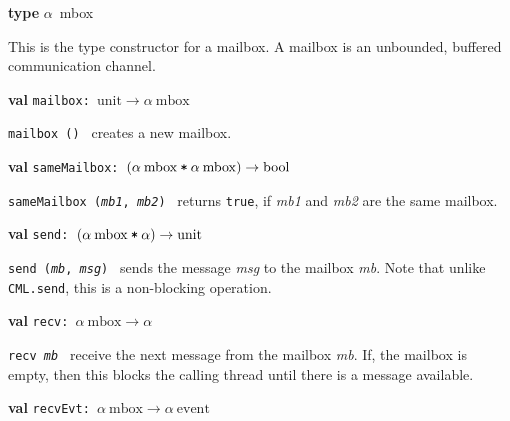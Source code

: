 \begin{descr}
\item {}{\textbf{type}} \(\alpha\)~mbox\label{ty-MAILBOX.mbox}

\begin{speccomment}
\item 

	This is the type constructor for a mailbox.\- 	A mailbox is an unbounded, buffered communication channel.\-     \end{speccomment}
\item {}{\textbf{val}} {\tt mailbox: \(\mathrm{unit}\rightarrow \alpha\:\mathrm{mbox}\)}\label{val-MAILBOX.mailbox}


\begin{speccomment}
\item {\tt mailbox ()         } 
creates a new mailbox.\-     \end{speccomment}
\item {}{\textbf{val}} {\tt sameMailbox: \((\alpha\:\mathrm{mbox}\:\verb,*,\:\alpha\:\mathrm{mbox})\rightarrow \mathrm{bool}\)}\label{val-MAILBOX.sameMailbox}


\begin{speccomment}
\item {\tt same\-Mailbox (\textit{mb1}, \textit{mb2})         } 
returns {\tt true}, if \textit{mb1} and \textit{mb2} are the same mailbox.\-     \end{speccomment}
\item {}{\textbf{val}} {\tt send: \((\alpha\:\mathrm{mbox}\:\verb,*,\:\alpha)\rightarrow \mathrm{unit}\)}\label{val-MAILBOX.send}


\begin{speccomment}
\item {\tt send (\textit{mb}, \textit{msg})         } 
sends the message \textit{msg} to the mailbox \textit{mb}.\- 	Note that unlike \texttt{CML.\-send}, this is a non-blocking 	operation.\-     \end{speccomment}
\item {}{\textbf{val}} {\tt recv: \(\alpha\:\mathrm{mbox}\rightarrow \alpha\)}\label{val-MAILBOX.recv}


\begin{speccomment}
\item {\tt recv \textit{mb}         } 
receive the next message from the mailbox \textit{mb}.\- 	If, the mailbox is empty, then this blocks the calling 	thread until there is a message available.\-     \end{speccomment}
\item {}{\textbf{val}} {\tt recvEvt: \(\alpha\:\mathrm{mbox}\rightarrow \alpha\:\mathrm{event}\)}\label{val-MAILBOX.recvEvt}



\end{descr}
